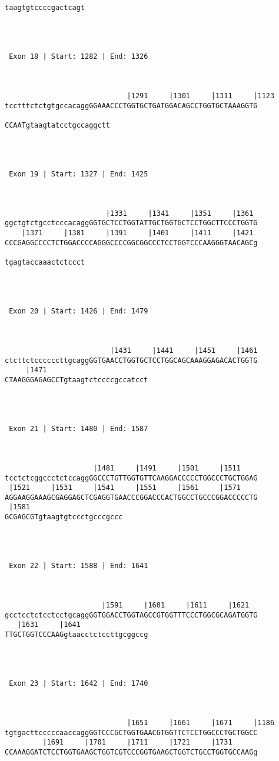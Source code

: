 \documentclass{article}
\begin{document}
\begin{Verbatim}
taagtgtccccgactcagt




 Exon 18 | Start: 1282 | End: 1326 



                             |1291     |1301     |1311     |1123
tcctttctctgtgccacaggGGAAACCCTGGTGCTGATGGACAGCCTGGTGCTAAAGGTG
                         
CCAATgtaagtatcctgccaggctt




 Exon 19 | Start: 1327 | End: 1425 



                        |1331     |1341     |1351     |1361 
ggctgtctgcctcccacaggGGTGCTCCTGGTATTGCTGGTGCTCCTGGCTTCCCTGGTG
    |1371     |1381     |1391     |1401     |1411     |1421 
CCCGAGGCCCCTCTGGACCCCAGGGCCCCGGCGGCCCTCCTGGTCCCAAGGGTAACAGCg
                   
tgagtaccaaactctccct




 Exon 20 | Start: 1426 | End: 1479 



                         |1431     |1441     |1451     |1461
ctcttctccccccttgcaggGGTGAACCTGGTGCTCCTGGCAGCAAAGGAGACACTGGTG
     |1471                        
CTAAGGGAGAGCCTgtaagtctccccgccatcct




 Exon 21 | Start: 1480 | End: 1587 



                     |1481     |1491     |1501     |1511    
tcctctcggccctctccaggGGCCCTGTTGGTGTTCAAGGACCCCCTGGCCCTGCTGGAG
 |1521     |1531     |1541     |1551     |1561     |1571    
AGGAAGGAAAGCGAGGAGCTCGAGGTGAACCCGGACCCACTGGCCTGCCCGGACCCCCTG
 |1581                      
GCGAGCGTgtaagtgtccctgcccgccc




 Exon 22 | Start: 1588 | End: 1641 



                       |1591     |1601     |1611     |1621  
gcctcctctcctcctgcaggGGTGGACCTGGTAGCCGTGGTTTCCCTGGCGCAGATGGTG
   |1631     |1641                
TTGCTGGTCCCAAGgtaacctctccttgcggccg




 Exon 23 | Start: 1642 | End: 1740 



                             |1651     |1661     |1671     |1186
tgtgacttcccccaaccaggGGTCCCGCTGGTGAACGTGGTTCTCCTGGCCCTGCTGGCC
         |1691     |1701     |1711     |1721     |1731      
CCAAAGGATCTCCTGGTGAAGCTGGTCGTCCCGGTGAAGCTGGTCTGCCTGGTGCCAAGg
                   

\end{Verbatim}
\end{document}
